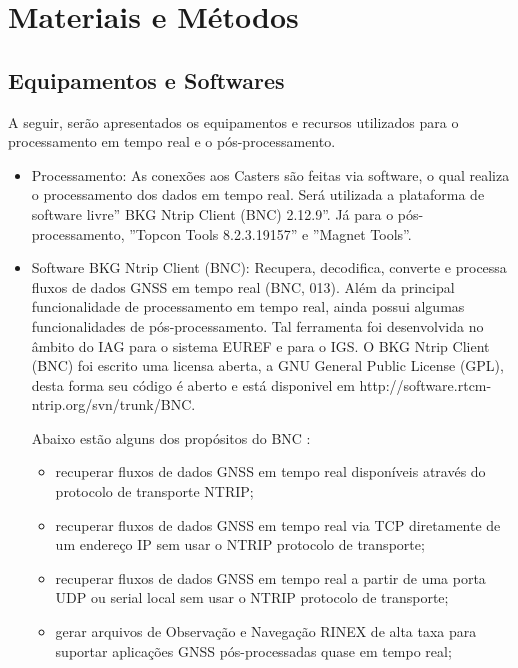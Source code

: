 \chapter{Materiais e Métodos}


\section{Equipamentos e Softwares}
\label{materiais}

A seguir, serão apresentados os equipamentos e recursos utilizados para o processamento em tempo real e o pós-processamento.

\begin{itemize}

\item Processamento: As conexões aos Casters são feitas via software, o qual realiza o processamento dos dados em tempo real. Será utilizada a plataforma de software livre” BKG Ntrip Client (BNC) 2.12.9”. Já para o pós-processamento, ''Topcon Tools 8.2.3.19157'' e ''Magnet Tools''.    

\item Software BKG Ntrip Client (BNC): Recupera, decodifica, converte e processa fluxos de dados GNSS em tempo real (BNC, 013). Além da principal funcionalidade de processamento em tempo real, ainda possui algumas funcionalidades de pós-processamento. Tal ferramenta foi desenvolvida no âmbito do IAG para o sistema EUREF e para o IGS. O BKG Ntrip Client (BNC) foi escrito uma licensa aberta, a GNU General Public License (GPL), desta forma seu código é aberto e está disponivel em http://software.rtcm-ntrip.org/svn/trunk/BNC.
        
        Abaixo estão alguns dos propósitos do BNC \citep{bnc}:
        \begin{itemize}
            \item recuperar fluxos de dados GNSS em tempo real disponíveis através do protocolo de transporte NTRIP;
            \item recuperar fluxos de dados GNSS em tempo real via TCP diretamente de um endereço IP sem usar o NTRIP protocolo de transporte;
            \item recuperar fluxos de dados GNSS em tempo real a partir de uma porta UDP ou serial local sem usar o NTRIP protocolo de transporte;
            \item gerar arquivos de Observação e Navegação RINEX de alta taxa para suportar aplicações GNSS pós-processadas quase em tempo real;
        \end{itemize}


\end{itemize}
